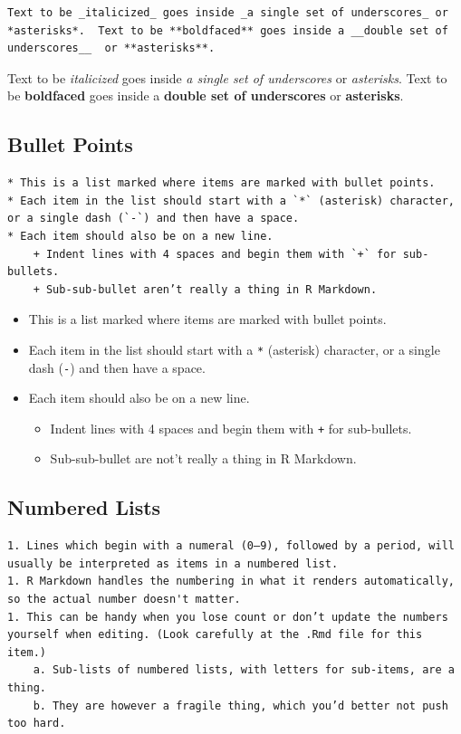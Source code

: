 \documentclass[]{book}
\providecommand{\tightlist}{%
  \setlength{\itemsep}{0pt}\setlength{\parskip}{0pt}}
\begin{document}
\begin{verbatim}
Text to be _italicized_ goes inside _a single set of underscores_ or *asterisks*.  Text to be **boldfaced** goes inside a __double set of underscores__  or **asterisks**.
\end{verbatim}

Text to be \emph{italicized} goes inside \emph{a single set of
underscores} or \emph{asterisks}. Text to be \textbf{boldfaced} goes
inside a \textbf{double set of underscores} or \textbf{asterisks}.

\subsection{Bullet Points}\label{bullet-points}

\begin{verbatim}
* This is a list marked where items are marked with bullet points.
* Each item in the list should start with a `*` (asterisk) character, or a single dash (`-`) and then have a space.
* Each item should also be on a new line.
    + Indent lines with 4 spaces and begin them with `+` for sub-bullets.
    + Sub-sub-bullet aren’t really a thing in R Markdown.
\end{verbatim}

\begin{itemize}
\tightlist
\item
  This is a list marked where items are marked with bullet points.
\item
  Each item in the list should start with a \texttt{*} (asterisk)
  character, or a single dash (\texttt{-}) and then have a space.
\item
  Each item should also be on a new line.

  \begin{itemize}
  \tightlist
  \item
    Indent lines with 4 spaces and begin them with \texttt{+} for
    sub-bullets.
  \item
    Sub-sub-bullet are not't really a thing in R Markdown.
  \end{itemize}
\end{itemize}

\subsection{Numbered Lists}\label{numbered-lists}

\begin{verbatim}
1. Lines which begin with a numeral (0–9), followed by a period, will usually be interpreted as items in a numbered list.
1. R Markdown handles the numbering in what it renders automatically, so the actual number doesn't matter.
1. This can be handy when you lose count or don’t update the numbers yourself when editing. (Look carefully at the .Rmd file for this item.)
    a. Sub-lists of numbered lists, with letters for sub-items, are a thing.
    b. They are however a fragile thing, which you’d better not push too hard.
\end{verbatim}
\end{document}
